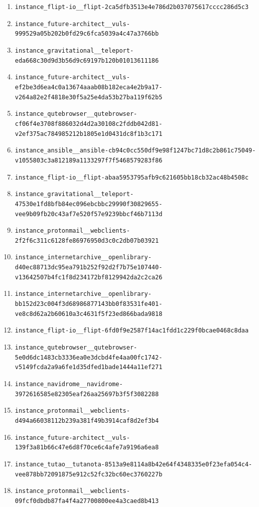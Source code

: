\documentclass{llmxive}
\begin{document}
\begin{enumerate}
\item \texttt{instance\_flipt-io\_\_flipt-2ca5dfb3513e4e786d2b037075617cccc286d5c3}
\item \texttt{instance\_future-architect\_\_vuls-999529a05b202b0fd29c6fca5039a4c47a3766bb}
\item \texttt{instance\_gravitational\_\_teleport-eda668c30d9d3b56d9c69197b120b01013611186}
\item \texttt{instance\_future-architect\_\_vuls-ef2be3d6ea4c0a13674aaab08b182eca4e2b9a17-v264a82e2f4818e30f5a25e4da53b27ba119f62b5}
\item \texttt{instance\_qutebrowser\_\_qutebrowser-cf06f4e3708f886032d4d2a30108c2fddb042d81-v2ef375ac784985212b1805e1d0431dc8f1b3c171}
\item \texttt{instance\_ansible\_\_ansible-cb94c0cc550df9e98f1247bc71d8c2b861c75049-v1055803c3a812189a1133297f7f5468579283f86}
\item \texttt{instance\_flipt-io\_\_flipt-abaa5953795afb9c621605bb18cb32ac48b4508c}
\item \texttt{instance\_gravitational\_\_teleport-47530e1fd8bfb84ec096ebcbbc29990f30829655-vee9b09fb20c43af7e520f57e9239bbcf46b7113d}
\item \texttt{instance\_protonmail\_\_webclients-2f2f6c311c6128fe86976950d3c0c2db07b03921}
\item \texttt{instance\_internetarchive\_\_openlibrary-d40ec88713dc95ea791b252f92d2f7b75e107440-v13642507b4fc1f8d234172bf8129942da2c2ca26}
\item \texttt{instance\_internetarchive\_\_openlibrary-bb152d23c004f3d68986877143bb0f83531fe401-ve8c8d62a2b60610a3c4631f5f23ed866bada9818}
\item \texttt{instance\_flipt-io\_\_flipt-6fd0f9e2587f14ac1fdd1c229f0bcae0468c8daa}
\item \texttt{instance\_qutebrowser\_\_qutebrowser-5e0d6dc1483cb3336ea0e3dcbd4fe4aa00fc1742-v5149fcda2a9a6fe1d35dfed1bade1444a11ef271}
\item \texttt{instance\_navidrome\_\_navidrome-3972616585e82305eaf26aa25697b3f5f3082288}
\item \texttt{instance\_protonmail\_\_webclients-d494a66038112b239a381f49b3914caf8d2ef3b4}
\item \texttt{instance\_future-architect\_\_vuls-139f3a81b66c47e6d8f70ce6c4afe7a9196a6ea8}
\item \texttt{instance\_tutao\_\_tutanota-8513a9e8114a8b42e64f4348335e0f23efa054c4-vee878bb72091875e912c52fc32bc60ec3760227b}
\item \texttt{instance\_protonmail\_\_webclients-09fcf0dbdb87fa4f4a27700800ee4a3caed8b413}

\end{enumerate}
\end{document}
